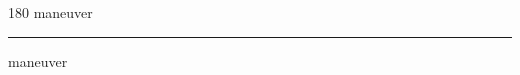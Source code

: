 
\begin{frame}
\begin{center}
\begin{turn}{180}
{\fontsize{2.5cm}{1em}\selectfont maneuver}
\end{turn}
\vspace{1em}\par  
\hrule
\vspace{1em}\par  
{\fontsize{2.5cm}{1em}\selectfont maneuver}
\end{center}
\end{frame}
